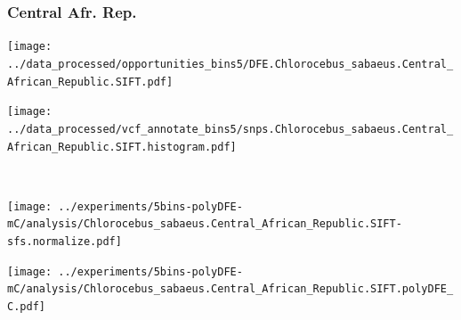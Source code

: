 \subsubsection{Central Afr. Rep.}

\begin{minipage}{0.49\linewidth}
    \texttt{[image: ../data\_processed/opportunities\_bins5/DFE.Chlorocebus\_sabaeus.Central\_African\_Republic.SIFT.pdf]}
\end{minipage}
\begin{minipage}{0.49\linewidth}
    \texttt{[image: ../data\_processed/vcf\_annotate\_bins5/snps.Chlorocebus\_sabaeus.Central\_African\_Republic.SIFT.histogram.pdf]}
\end{minipage}
\\
\begin{minipage}{0.49\linewidth}
    \texttt{[image: ../experiments/5bins-polyDFE-mC/analysis/Chlorocebus\_sabaeus.Central\_African\_Republic.SIFT-sfs.normalize.pdf]}
\end{minipage}
\begin{minipage}{0.4\linewidth}
    \texttt{[image: ../experiments/5bins-polyDFE-mC/analysis/Chlorocebus\_sabaeus.Central\_African\_Republic.SIFT.polyDFE\_C.pdf]}
\end{minipage}
